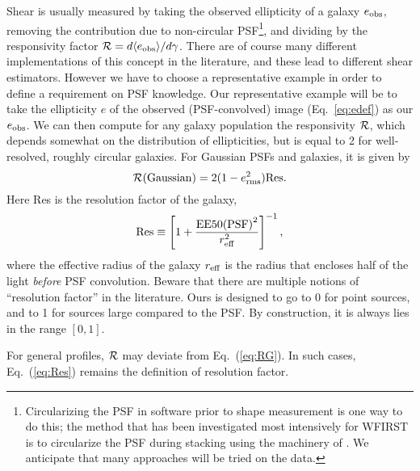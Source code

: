 Shear is usually measured by taking the observed ellipticity of a galaxy $e_{\rm obs}$, removing the contribution due to non-circular PSF\footnote{Circularizing the PSF in software prior to shape measurement is one way to do this; the method that has been investigated most intensively for WFIRST is to circularize the PSF during stacking using the machinery of \citet{2011ApJ...741...46R}. We anticipate that many approaches will be tried on the data.}, and dividing by the responsivity factor ${\cal R} = d\langle e_{\rm obs}\rangle/d\gamma$. There are of course many different implementations of this concept in the literature, and these lead to different shear estimators. However we have to choose a representative example in order to define a requirement on PSF knowledge. Our representative example will be to take the ellipticity $e$ of the observed (PSF-convolved) image (Eq.~\ref{eq:edef}) as our $e_{\rm obs}$. We can then compute for any galaxy population the responsivity ${\cal R}$, which depends somewhat on the distribution of ellipticities, but is equal to 2 for well-resolved, roughly circular galaxies. For Gaussian PSFs and galaxies, it is given by
\begin{equation}
{\cal R} ({\rm Gaussian}) = 2 (1-e^2_{\rm rms}) {\rm Res}.
\label{eq:RG}
\end{equation}
Here Res is the resolution factor of the galaxy,
\begin{equation}
{\rm Res} \equiv \left[ 1 + \frac{{\rm EE50(PSF)}^2}{r_{\rm eff}^2} \right]^{-1},
\label{eq:Res}
\end{equation}
where the effective radius of the galaxy $r_{\rm eff}$ is the radius that encloses half of the light {\em before} PSF convolution. Beware that there are multiple notions of ``resolution factor'' in the literature. Ours is designed to go to 0 for point sources, and to 1 for sources large compared to the PSF. By construction, it is always lies in the range $[0,1]$.

For general profiles, ${\cal R}$ may deviate from Eq.~(\ref{eq:RG}). In such cases, Eq.~(\ref{eq:Res}) remains the definition of resolution factor.

